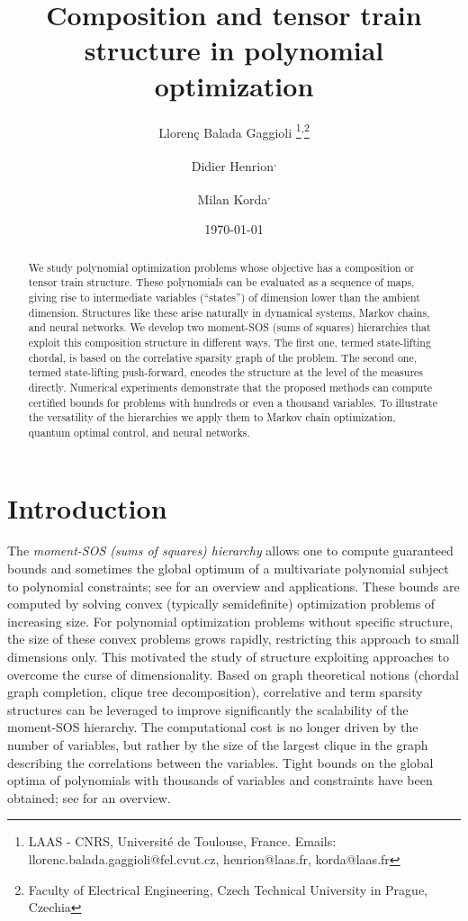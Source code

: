 \documentclass[11pt,a4paper]{article}
\title{Composition and tensor train structure in polynomial optimization}
\author{Lloren\c{c} Balada Gaggioli \thanks{
LAAS - CNRS, Université de Toulouse, France. Emails: llorenc.balada.gaggioli@fel.cvut.cz, henrion@laas.fr, korda@laas.fr}\textsuperscript{\;\;,}\thanks{
Faculty of Electrical Engineering, Czech Technical University in Prague, Czechia}  
\and Didier Henrion\footnotemark[1]\textsuperscript{\;\;,}\footnotemark[2]
\and Milan Korda\footnotemark[1]\textsuperscript{\;\;,}\footnotemark[2]}
\date{\today}
\theoremstyle{definition}
\begin{document}
\maketitle

\begin{abstract}
    
    We study polynomial optimization problems whose objective has a composition or tensor train structure. These polynomials can be evaluated as a sequence of maps, giving rise to intermediate variables (``states'') of dimension lower than the ambient dimension. Structures like these arise naturally in dynamical systems, Markov chains, and neural networks. We develop two moment-SOS (sums of squares) hierarchies that exploit this composition structure in different ways. The first one, termed state-lifting chordal, is based on the correlative sparsity graph of the problem. The second one, termed state-lifting push-forward, encodes the structure at the level of the measures directly. Numerical experiments demonstrate that the proposed methods can compute certified bounds for problems with hundreds or even a thousand variables. To illustrate the versatility of the hierarchies we apply them to Markov chain optimization, quantum optimal control, and neural networks.
\end{abstract}


\section{Introduction}

The \emph{moment-SOS (sums of squares) hierarchy} allows one to compute guaranteed bounds and sometimes the global optimum
of a multivariate polynomial subject to polynomial constraints; see \cite{HenrionKordaLasserre2020} for an overview
and applications. These bounds are computed by solving convex (typically
semidefinite) optimization problems of increasing size. For polynomial optimization problems without specific structure,
the size of these convex problems grows rapidly, restricting this approach to small dimensions only.
This motivated the study of structure exploiting approaches to overcome the curse of dimensionality.
Based on graph theoretical notions (chordal graph completion, clique tree decomposition), correlative and term
sparsity structures can be leveraged to improve significantly the scalability of the moment-SOS hierarchy.
The computational cost is no longer driven by the number of variables, but rather by the size of the largest
clique in the graph describing the correlations between the variables.
Tight bounds on the global optima of polynomials with thousands of variables and constraints have been obtained; see \cite{MagronWang23} for an overview.
\end{document}
